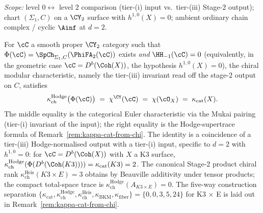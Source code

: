 \begin{theorem}[Categorical kappa equals chiral kappa at \texorpdfstring{$d = 2$}{d = 2}, \texorpdfstring{$h^{1,0} = 0$}{h-1,0 = 0}: CY-D\texorpdfstring{$_2$}{-2}]
\label{thm:cy-d-d2}
\textsl{Scope:} level $0 \leftrightarrow$ level $2$ comparison
(tier-(i) input vs.\ tier-(iii) Stage-$2$ output); chart
$(\Sigma_1, C)$ on a $\CY_2$ surface with $h^{1,0}(X) = 0$;
ambient ordinary chain complex / cyclic $\Ainf$ at $d = 2$.

For $\cC$ a smooth proper $\CY_2$ category such that $\Phi(\cC) = \SpCh_{\Sigma_1,C}(\PhiFA_2(\cC))$ exists \emph{and} $\HH_{-1}(\cC) = 0$ (equivalently, in the geometric case $\cC = D^b(\Coh(X))$, the hypothesis $h^{1,0}(X) = 0$), the chiral modular characteristic, namely the tier-(iii) invariant read off the stage-$2$ output on $C$, satisfies
\[
 \kappa_{\mathrm{ch}}^{\mathrm{Hodge}}\big(\Phi(\cC)\big) \;=\; \chi^{\CY}(\cC) \;=\; \chi(\cO_X) \;=\; \kappa_{\mathrm{cat}}(X).
\]
The middle equality is the categorical Euler characteristic via the Mukai pairing (tier-(i) invariant of the input); the right equality is the Hodge-supertrace formula of Remark~\textup{\ref{rem:kappa-cat-from-chi}}. The identity is a coincidence of a tier-(iii) Hodge-normalised output with a tier-(i) input, specific to $d = 2$ with $h^{1,0}=0$: for $\cC = D^b(\Coh(X))$ with $X$ a K3 surface, $\kappa_{\mathrm{ch}}^{\mathrm{Hodge}}(\Phi(D^b(\Coh(K3)))) = \kappa_{\mathrm{cat}}(K3) = 2$. The canonical Stage-2 product chiral rank $\kappa_{\mathrm{ch}}^{\mathrm{Heis}}(K3 \times E) = 3$ obtains by Beauville additivity under tensor products; the compact total-space trace is $\kappa_{\mathrm{ch}}^{\mathrm{Hodge}}(A_{K3\times E})=0$. The five-way construction separation $\{\kappa_{\mathrm{cat}}, \kappa_{\mathrm{ch}}^{\mathrm{Hodge}}, \kappa_{\mathrm{ch}}^{\mathrm{Heis}}, \kappa_{\mathrm{BKM}}, \kappa_{\mathrm{fiber}}\} = \{0, 0, 3, 5, 24\}$ for K3 $\times$ E is laid out in Remark~\textup{\ref{rem:kappa-cat-from-chi}}.
\end{theorem}

